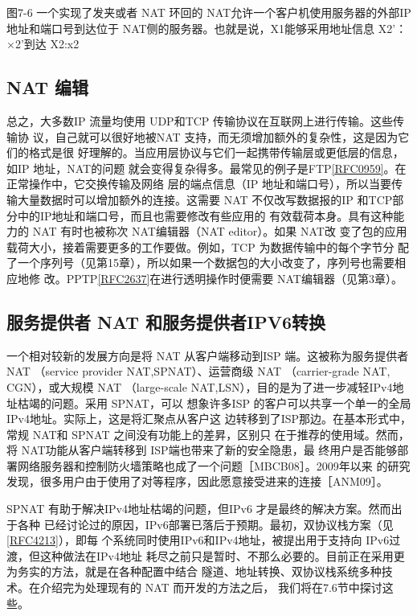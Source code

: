 图7-6 一个实现了发夹或者 NAT 环回的 NAT允许一个客户机使用服务器的外部IP
地址和端口号到达位于 NAT侧的服务器。也就是说，X1能够采用地址信息
X2'：×2'到达 X2:x2

\subsection{NAT 编辑}

总之，大多数IP 流量均使用 UDP和TCP 传输协议在互联网上进行传输。这些传输协
议，自己就可以很好地被NAT 支持，而无须增加额外的复杂性，这是因为它们的格式是很
好理解的。当应用层协议与它们一起携带传输层或更低层的信息，如IP 地址，NAT的问题
就会变得复杂得多。最常见的例子是FTP\href{https://www.rfc-editor.org/rfc/rfc0959}{[RFC0959]}。在正常操作中，它交换传输及网络
层的端点信息（IP 地址和端口号），所以当要传输大量数据时可以增加额外的连接。这需要
NAT 不仅改写数据报的IP 和TCP部分中的IP地址和端口号，而且也需要修改有些应用的
有效载荷本身。具有这种能力的 NAT 有时也被称次 NAT编辑器（NAT editor）。如果 NAT改
变了包的应用载荷大小，接着需要更多的工作要做。例如，TCP 为数据传输中的每个字节分
配了一个序列号（见第15章），所以如果一个数据包的大小改变了，序列号也需要相应地修
改。PPTP\href{https://www.rfc-editor.org/rfc/rfc2637}{[RFC2637]}在进行透明操作时便需要
NAT编辑器（见第3章）。

\subsection{服务提供者 NAT 和服务提供者IPV6转换}

一个相对较新的发展方向是将 NAT 从客户端移动到ISP 端。这被称为服务提供者 NAT
（service provider NAT,SPNAT）、运营商级 NAT （carrier-grade NAT, CGN），或大规模 NAT
（large-scale NAT,LSN），目的是为了进一步减轻IPv4地址枯竭的问题。采用 SPNAT，可以
想象许多ISP 的客户可以共享一个单一的全局IPv4地址。实际上，这是将汇聚点从客户这
边转移到了ISP那边。在基本形式中，常规 NAT和 SPNAT 之间没有功能上的差昇，区别只
在于推荐的使用域。然而，将 NAT功能从客户端转移到 ISP端也带来了新的安全隐患，最
终用户是否能够部署网络服务器和控制防火墙策略也成了一个问题［MBCB08］。2009年以来
的研究发现，很多用户由于使用了对等程序，因此愿意接受进来的连接［ANM09］。

SPNAT 有助于解决IPv4地址枯竭的问题，但IPv6 才是最终的解决方案。然而出于各种
已经讨论过的原因，IPv6部署已落后于预期。最初，双协议栈方案（见\href{https://www.rfc-editor.org/rfc/rfc4213}{[RFC4213]}），即每
个系统同时使用IPv6和IPv4地址，被提出用于支持向 IPv6过渡，但这种做法在IPv4地址
耗尽之前只是暂时、不那么必要的。目前正在采用更为务实的方法，就是在各种配置中结合
隧道、地址转换、双协议栈系统多种技术。在介绍完为处理现有的 NAT 而开发的方法之后，
我们将在7.6节中探讨这些。

